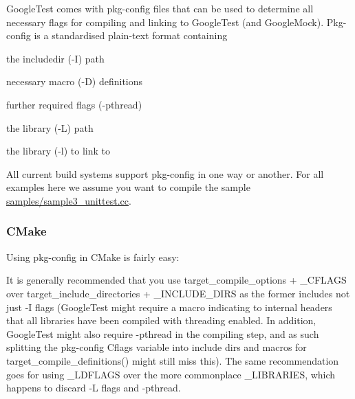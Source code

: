 Google\+Test comes with pkg-\/config files that can be used to determine all necessary flags for compiling and linking to Google\+Test (and Google\+Mock). Pkg-\/config is a standardised plain-\/text format containing


\begin{DoxyItemize}
\item the includedir (-\/I) path
\item necessary macro (-\/D) definitions
\item further required flags (-\/pthread)
\item the library (-\/L) path
\item the library (-\/l) to link to
\end{DoxyItemize}

All current build systems support pkg-\/config in one way or another. For all examples here we assume you want to compile the sample {\ttfamily \mbox{\hyperlink{sample3__unittest_8cc}{samples/sample3\+\_\+unittest.\+cc}}}.

\subsubsection*{C\+Make}

Using {\ttfamily pkg-\/config} in C\+Make is fairly easy\+:


\begin{DoxyCode}{0}
\DoxyCodeLine{}
\DoxyCodeLine{}
\DoxyCodeLine{}
\DoxyCodeLine{}
\end{DoxyCode}


It is generally recommended that you use {\ttfamily target\+\_\+compile\+\_\+options} + {\ttfamily \+\_\+\+C\+F\+L\+A\+GS} over {\ttfamily target\+\_\+include\+\_\+directories} + {\ttfamily \+\_\+\+I\+N\+C\+L\+U\+D\+E\+\_\+\+D\+I\+RS} as the former includes not just -\/I flags (Google\+Test might require a macro indicating to internal headers that all libraries have been compiled with threading enabled. In addition, Google\+Test might also require {\ttfamily -\/pthread} in the compiling step, and as such splitting the pkg-\/config {\ttfamily Cflags} variable into include dirs and macros for {\ttfamily target\+\_\+compile\+\_\+definitions()} might still miss this). The same recommendation goes for using {\ttfamily \+\_\+\+L\+D\+F\+L\+A\+GS} over the more commonplace {\ttfamily \+\_\+\+L\+I\+B\+R\+A\+R\+I\+ES}, which happens to discard {\ttfamily -\/L} flags and {\ttfamily -\/pthread}.

